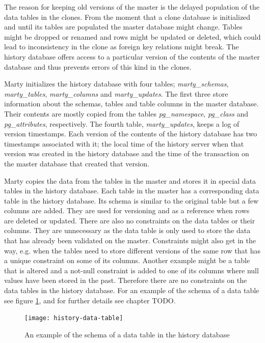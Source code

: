 The reason for keeping old versions of the master is the delayed population of the data tables in the clones.
From the moment that a clone database is initialized and until its tables are populated the master database might change.
Tables might be dropped or renamed and rows might be updated or deleted, which could lead to inconsistency in the clone as foreign key relations might break.
The history database offers access to a particular version of the contents of the master database and thus prevents errors of this kind in the clones.

Marty initializes the history database with four tables; \textit{marty\_schemas}, \textit{marty\_tables}, \textit{marty\_columns} and \textit{marty\_updates}.
The first three store information about the schemas, tables and table columns in the master database.
Their contents are mostly copied from the tables \textit{pg\_namespace}, \textit{pg\_class} and \textit{pg\_attributes}, respectively.
The fourth table, \textit{marty\_updates}, keeps a log of version timestamps.
Each version of the contents of the history database has two timestamps associated with it; the local time of the history server when that version was created in the history database and the time of the transaction on the master database that created that version.

Marty copies the data from the tables in the master and stores it in special data tables in the history database.
Each table in the master has a corresponding data table in the history database.
Its schema is similar to the original table but a few columns are added.
They are used for versioning and as a reference when rows are deleted or updated.
There are also no constraints on the data tables or their columns.
They are unnecessary as the data table is only used to store the data that has already been validated on the master.
Constraints might also get in the way, e.g. when the tables need to store different versions of the same row that has a unique constraint on some of its columns.
Another example might be a table that is altered and a not-null constraint is added to one of its columns where null values have been stored in the past.
Therefore there are no constraints on the data tables in the history database.
For an example of the schema of a data table see figure \ref{history-data-table}, and for further details see chapter TODO.

\begin{figure}[h!]
  \centering
    \texttt{[image: history-data-table]}
  \caption{An example of the schema of a data table in the history database}
  \label{history-data-table}
\end{figure}

